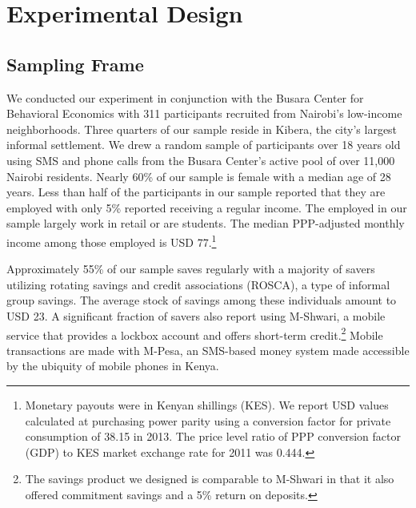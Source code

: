 \documentclass[11pt]{article}
\begin{document}

\section{Experimental Design} \label{sec:design}

	\subsection{Sampling Frame}

		We conducted our experiment in conjunction with the Busara Center for Behavioral Economics with 311 participants recruited from Nairobi's low-income neighborhoods. Three quarters of our sample reside in Kibera, the city's largest informal settlement. We drew a random sample of participants over 18 years old using SMS and phone calls from the Busara Center's active pool of over 11,000 Nairobi residents. Nearly 60\% of our sample is female with a median age of 28 years. Less than half of the participants in our sample reported that they are employed with only 5\% reported receiving a regular income. The employed in our sample largely work in retail or are students. The median PPP-adjusted monthly income among those employed is USD 77.\footnote{Monetary payouts were in Kenyan shillings (KES). We report USD values calculated at purchasing power parity using a conversion factor for private consumption of 38.15 in 2013. The price level ratio of PPP conversion factor (GDP) to KES market exchange rate for 2011 was 0.444.}

		Approximately 55\% of our sample saves regularly with a majority of savers utilizing rotating savings and credit associations (ROSCA), a type of informal group savings. The average stock of savings among these individuals amount to USD 23. A significant fraction of savers also report using M-Shwari, a mobile service that provides a lockbox account and offers short-term credit.\footnote{The savings product we designed is comparable to M-Shwari in that it also offered commitment savings and a 5\% return on deposits.} Mobile transactions are made with M-Pesa, an SMS-based money system made accessible by the ubiquity of mobile phones in Kenya.
\end{document}
